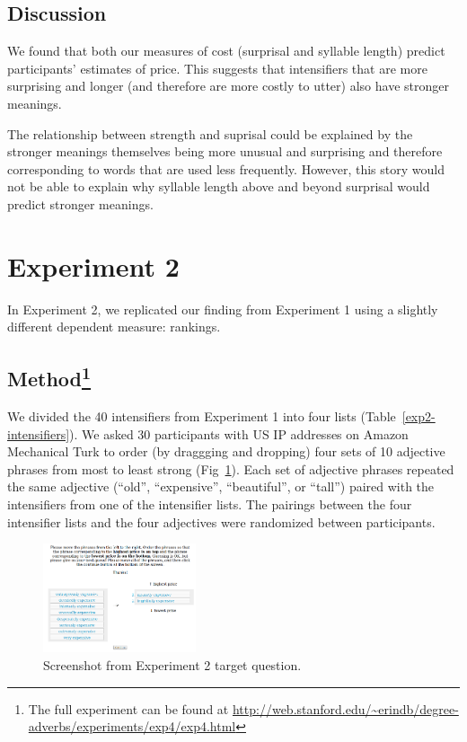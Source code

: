 \documentclass[10pt,letterpaper]{article}
\begin{document}
\subsection{Discussion}

We found that both our measures of cost (surprisal and syllable length) predict participants' estimates of price.
This suggests that intensifiers that are more surprising and longer (and therefore are more costly to utter) also have stronger meanings.

The relationship between strength and suprisal could be explained by the stronger meanings themselves being more unusual and surprising and therefore corresponding to words that are used less frequently.
However, this story would not be able to explain why syllable length above and beyond surprisal would predict stronger meanings.

\section{Experiment 2}

In Experiment 2, we replicated our finding from Experiment 1 using a slightly different dependent measure: rankings.

\subsection{Method\footnote{The full experiment can be found at \url{http://web.stanford.edu/~erindb/degree-adverbs/experiments/exp4/exp4.html}}}

We divided the 40 intensifiers from Experiment 1 into four lists (Table~\ref{exp2-intensifiers}). We asked 30 participants with US IP addresses on Amazon Mechanical Turk to order (by draggging and dropping) four sets of 10 adjective phrases from most to least strong (Fig~\ref{exp2-q}). Each set of adjective phrases repeated the same adjective (``old'', ``expensive'', ``beautiful'', or ``tall'') paired with the intensifiers from one of the intensifier lists. The pairings between the four intensifier lists and the four adjectives were randomized between participants.

\begin{figure}[ht]
\begin{center}
\includegraphics[width=0.4\textwidth]{analysis_files_for_writeup/images/exp2-q.png}
\end{center}
\caption{Screenshot from Experiment 2 target question.} 
\label{exp2-q}
\end{figure}
\end{document}
